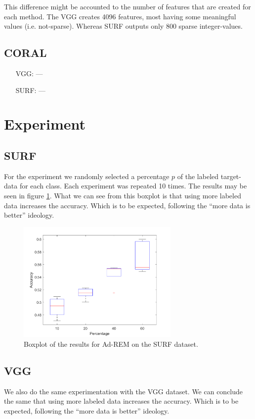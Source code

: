 \documentclass[11pt]{article}
\begin{document}
This difference might be accounted to the number of features that are created for each method. The VGG creates 4096 features, most having some meaningful values (i.e. not-sparse). Whereas SURF outputs only 800 sparse integer-values.

\subsection{CORAL}
\begin{itemize}
	\item[VGG:] ---
	\item[SURF:] ---
\end{itemize}

\section{Experiment}

\subsection{SURF}
For the experiment we randomly selected a percentage $p$ of the labeled target-data for each class. Each experiment was repeated 10 times. The results may be seen in figure \ref{fig:adrem_results_surf}. What we can see from this boxplot is that using more labeled data increases the accuracy. Which is to be expected, following the ``more data is better'' ideology. 

\begin{figure}[H]
	\centering
	\includegraphics[width=0.7\textwidth]{images/adrem_results_surf.png}
	\caption{Boxplot of the results for Ad-REM on the SURF dataset.}
	\label{fig:adrem_results_surf}
\end{figure}

\subsection{VGG}
We also do the same experimentation with the VGG dataset. We can conclude the same that using more labeled data increases the accuracy. Which is to be expected, following the ``more data is better'' ideology. 
\end{document}
